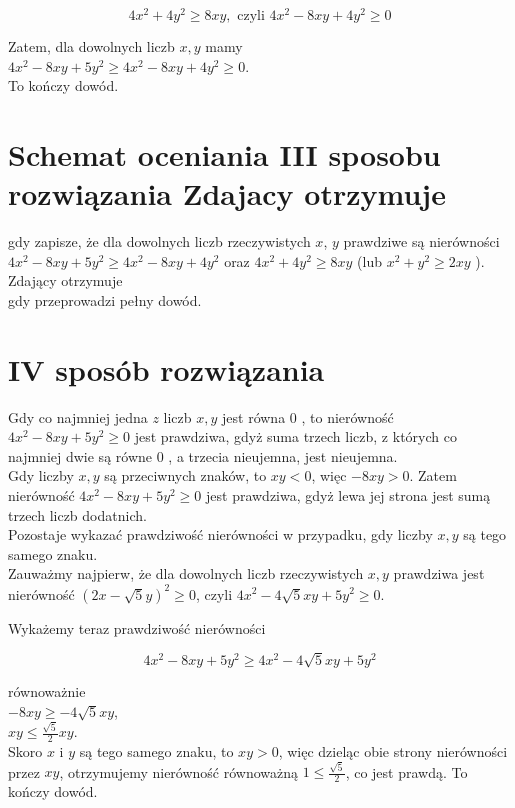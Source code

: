\documentclass[10pt]{article}
\begin{document}
$$
4 x^{2}+4 y^{2} \geq 8 x y, \text { czyli } 4 x^{2}-8 x y+4 y^{2} \geq 0
$$

Zatem, dla dowolnych liczb $x, y$ mamy\\
$4 x^{2}-8 x y+5 y^{2} \geq 4 x^{2}-8 x y+4 y^{2} \geq 0$.\\
To kończy dowód.

\section*{Schemat oceniania III sposobu rozwiązania Zdajacy otrzymuje}
gdy zapisze, że dla dowolnych liczb rzeczywistych $x$, $y$ prawdziwe są nierówności $4 x^{2}-8 x y+5 y^{2} \geq 4 x^{2}-8 x y+4 y^{2}$ oraz $4 x^{2}+4 y^{2} \geq 8 x y$ (lub $x^{2}+y^{2} \geq 2 x y$ ).\\
Zdający otrzymuje\\
gdy przeprowadzi pełny dowód.

\section*{IV sposób rozwiązania}
Gdy co najmniej jedna $z$ liczb $x, y$ jest równa 0 , to nierówność $4 x^{2}-8 x y+5 y^{2} \geq 0$ jest prawdziwa, gdyż suma trzech liczb, z których co najmniej dwie są równe 0 , a trzecia nieujemna, jest nieujemna.\\
Gdy liczby $x, y$ są przeciwnych znaków, to $x y<0$, więc $-8 x y>0$. Zatem nierówność $4 x^{2}-8 x y+5 y^{2} \geq 0$ jest prawdziwa, gdyż lewa jej strona jest sumą trzech liczb dodatnich.\\
Pozostaje wykazać prawdziwość nierówności w przypadku, gdy liczby $x, y$ są tego samego znaku.\\
Zauważmy najpierw, że dla dowolnych liczb rzeczywistych $x, y$ prawdziwa jest nierówność $(2 x-\sqrt{5} y)^{2} \geq 0$, czyli $4 x^{2}-4 \sqrt{5} x y+5 y^{2} \geq 0$.

Wykażemy teraz prawdziwość nierówności

$$
4 x^{2}-8 x y+5 y^{2} \geq 4 x^{2}-4 \sqrt{5} x y+5 y^{2}
$$

równoważnie\\
$-8 x y \geq-4 \sqrt{5} x y$,\\
$x y \leq \frac{\sqrt{5}}{2} x y$.\\
Skoro $x$ i $y$ są tego samego znaku, to $x y>0$, więc dzieląc obie strony nierówności przez $x y$, otrzymujemy nierówność równoważną $1 \leq \frac{\sqrt{5}}{2}$, co jest prawdą. To kończy dowód.
\end{document}
